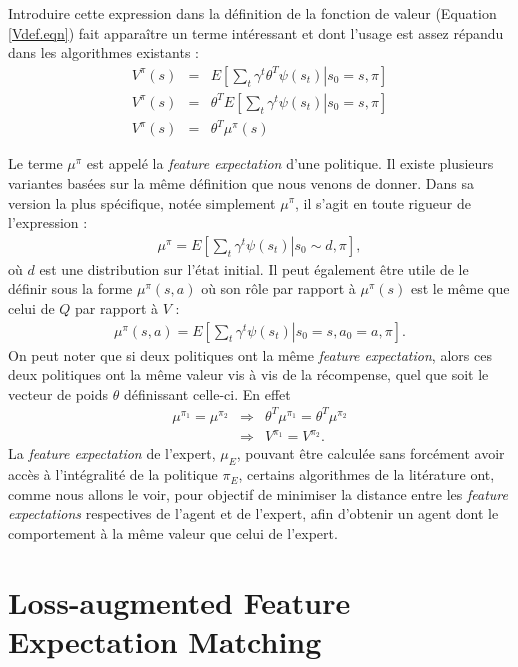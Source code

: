 \documentclass[publibook-draft]{CAp2012}
\begin{document}
Introduire cette expression dans la définition de la fonction de valeur (Equation \ref{Vdef.eqn}) fait apparaître un terme intéressant et dont l'usage est assez répandu dans les algorithmes existants :
\begin{eqnarray}
V^\pi(s) &=& E\left[\left.\sum_t\gamma^t\theta^T\psi(s_t)\right|s_0=s,\pi\right]\\
V^\pi(s) &=& \theta^TE\left[\left.\sum_t\gamma^t\psi(s_t)\right|s_0=s,\pi\right]\\
V^\pi(s) &=& \theta^T\mu^\pi(s)
\end{eqnarray}

Le terme $\mu^\pi$ est appelé la {\it feature expectation} d'une politique. Il existe plusieurs variantes basées sur la même définition que nous venons de donner. Dans sa version la plus spécifique, notée simplement $\mu^\pi$, il s'agit en toute rigueur de l'expression :
\begin{eqnarray}
\mu^\pi = E\left[\left.\sum_t\gamma^t\psi(s_t)\right|s_0\sim d,\pi\right],
\end{eqnarray}
où $d$ est une distribution sur l'état initial. Il peut également être utile de le définir sous la forme $\mu^\pi(s,a)$ où son rôle par rapport à $\mu^\pi(s)$ est le même que celui de $Q$ par rapport à $V$ :
\begin{eqnarray}
\mu^\pi(s,a) = E\left[\left.\sum_t\gamma^t\psi(s_t)\right|s_0=s,a_0=a,\pi\right].
\end{eqnarray}
On peut noter que si deux politiques ont la même {\it feature expectation}, alors ces deux politiques ont la même valeur vis à vis de la récompense, quel que soit le vecteur de poids $\theta$ définissant celle-ci. En effet 
\begin{eqnarray}
\mu^{\pi_1} = \mu^{\pi_2} &\Rightarrow& \theta^T\mu^{\pi_1} = \theta^T\mu^{\pi_2}\\
& \Rightarrow& V^{\pi_1} = V^{\pi_2}.
\end{eqnarray}
La {\it feature expectation} de l'expert, $\mu_E$, pouvant être calculée sans forcément avoir accès à l'intégralité de la politique $\pi_E$, certains algorithmes de la litérature ont, comme nous allons le voir, pour objectif de minimiser la distance entre les {\it feature expectations} respectives de l'agent et de l'expert, afin d'obtenir un agent dont le comportement à la même valeur que celui de l'expert.
\section{Loss-augmented Feature Expectation Matching}
\end{document}
